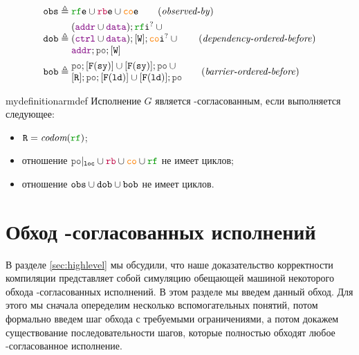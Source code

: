 \begin{align*}
\lOBS &\defeq  \lRFE \cup \lFRE \cup \lCOE  \tag{\emph{observed-by}} \\
\lDOB &\defeq \inarr{(\lADDR \cup \lDATA); \lRFI^? \cup {} \\
	(\lCTRL \cup \lDATA); [\lW]; \lCOI^? \cup {} \\
	\lADDR; \lPO; [\lW]} \tag{\emph{dependency-ordered-before}} \\
\lBOB &\defeq \inarr{\lPO; [\lDMBSY] \cup [\lDMBSY]; \lPO  \cup {} \\
                    {} [\lR]; \lPO; [\lDMBLD] \cup [\lDMBLD]; \lPO} \tag{\emph{barrier-ordered-before}}
\end{align*}

\begin{restatable}{mydefinition}{armdef}
Исполнение $G$ является \ARM-согласованным, если выполняется следующее:
\begin{itemize}
\item $\lR = \codom{\lRF}$; 
\item отношение $\lPO\rst{\lLOC} \cup \lFR \cup \lCO \cup \lRF$ не имеет циклов; 
\item отношение ${\mathtt{obs}} \cup {\mathtt{dob}} \cup {\mathtt{bob}}$ не имеет циклов. 
\end{itemize}
\end{restatable}

\section{Обход \ARM-согласованных исполнений}
\label{sec:traversal}

В разделе \ref{sec:highlevel} мы обсудили, что наше доказательство корректности компиляции представляет
собой симуляцию обещающей машиной некоторого обхода \ARM-согласованных исполнений. В этом разделе
мы введем данный обход. Для этого мы сначала опеределим несколько вспомогательных понятий,
потом формально введем шаг обхода с требуемыми ограничениями, а потом докажем существование
последовательности шагов, которые полностью обходят любое \ARM-согласованное исполнение.

